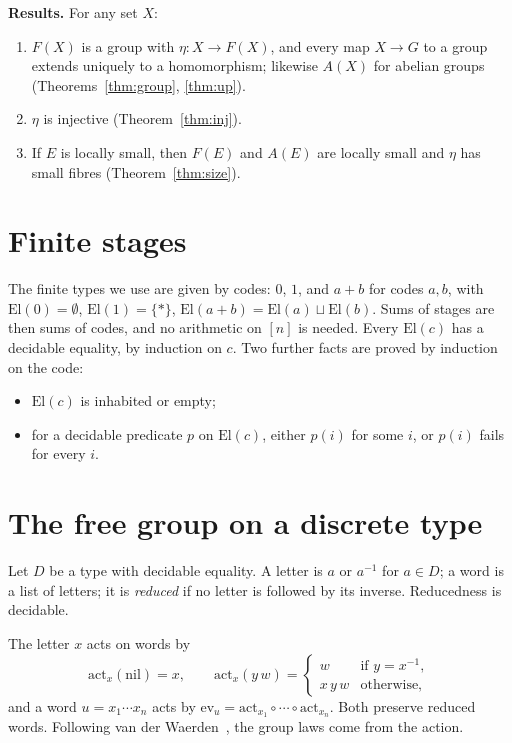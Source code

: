 \documentclass[11pt]{amsart}
\theoremstyle{definition}
\theoremstyle{remark}
\newcommand{\El}{\mathrm{El}}
\newcommand{\act}{\mathrm{act}}
\newcommand{\ev}{\mathrm{ev}}
\begin{document}
\smallskip\noindent\textbf{Results.} For any set $X$:
\begin{enumerate}
\item[(A)] $F(X)$ is a group with $\eta:X\to F(X)$, and every map $X\to G$
to a group extends uniquely to a homomorphism; likewise $A(X)$ for abelian
groups (Theorems~\ref{thm:group}, \ref{thm:up}).
\item[(B)] $\eta$ is injective (Theorem~\ref{thm:inj}).
\item[(C)] If $E$ is locally small, then $F(E)$ and $A(E)$ are locally
small and $\eta$ has small fibres (Theorem~\ref{thm:size}).
\end{enumerate}

\section{Finite stages}

The finite types we use are given by codes: $0$, $1$, and $a+b$ for codes
$a,b$, with $\El(0)=\emptyset$, $\El(1)=\{*\}$,
$\El(a+b)=\El(a)\sqcup\El(b)$. Sums of stages are then sums of codes, and
no arithmetic on $[n]$ is needed. Every $\El(c)$ has a decidable
equality, by induction on $c$. Two further facts are proved by
induction on the code:
\begin{itemize}
\item $\El(c)$ is inhabited or empty;
\item for a decidable predicate $p$ on $\El(c)$, either $p(i)$ for some
$i$, or $p(i)$ fails for every $i$.
\end{itemize}

\section{The free group on a discrete type}\label{sec:words}

Let $D$ be a type with decidable equality. A letter is $a$ or $a^{-1}$
for $a\in D$; a word is a list of letters; it is \emph{reduced} if no
letter is followed by its inverse. Reducedness is decidable.

The letter $x$ acts on words by
\[
\act_x(\mathrm{nil})=x,\qquad
\act_x(y\,w)=\begin{cases} w & \text{if } y=x^{-1},\\ x\,y\,w & \text{otherwise,}\end{cases}
\]
and a word $u=x_1\cdots x_n$ acts by $\ev_u=\act_{x_1}\circ\cdots\circ\act_{x_n}$.
Both preserve reduced words. Following van der Waerden~\cite{vdW}, the group laws
come from the action.
\end{document}
